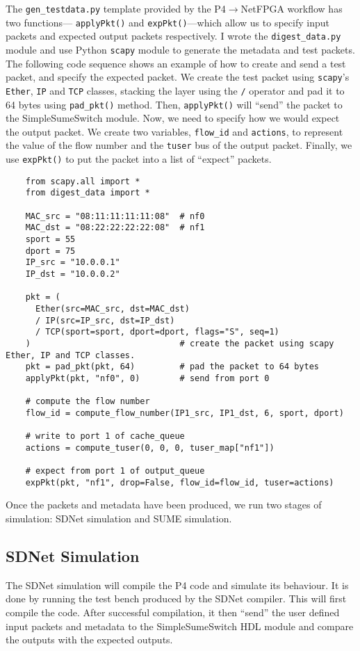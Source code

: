 The \texttt{gen\_testdata.py} template provided by the P4$\rightarrow$NetFPGA workflow has two functions--- \verb|applyPkt()| and \verb|expPkt()|---which allow us to specify input packets and expected output packets respectively. I wrote the \verb|digest_data.py| module and use Python \texttt{scapy} module to generate the metadata and test packets. The following code sequence shows an example of how to create and send a test packet, and specify the expected packet. We create the test packet using \texttt{scapy}'s \texttt{Ether}, \texttt{IP} and \texttt{TCP} classes, stacking the layer using the \texttt{/} operator and pad it to 64 bytes using \texttt{pad\_pkt()} method. Then, \verb|applyPkt()| will ``send'' the packet to the SimpleSumeSwitch module. Now, we need to specify how we would expect the output packet. We create two variables, \verb|flow_id| and \verb|actions|, to represent the value of the flow number and the \texttt{tuser} bus of the output packet. Finally, we use \verb|expPkt()| to put the packet into a list of ``expect'' packets.

{\renewcommand{\baselinestretch}{0.8}\small
	\begin{verbatim}
    from scapy.all import *
    from digest_data import *
	
    MAC_src = "08:11:11:11:11:08"  # nf0
    MAC_dst = "08:22:22:22:22:08"  # nf1
    sport = 55
    dport = 75
    IP_src = "10.0.0.1"
    IP_dst = "10.0.0.2"
	
    pkt = (
      Ether(src=MAC_src, dst=MAC_dst)
      / IP(src=IP_src, dst=IP_dst)
      / TCP(sport=sport, dport=dport, flags="S", seq=1)
    )                              # create the packet using scapy Ether, IP and TCP classes.
    pkt = pad_pkt(pkt, 64)         # pad the packet to 64 bytes
    applyPkt(pkt, "nf0", 0)        # send from port 0

    # compute the flow number
    flow_id = compute_flow_number(IP1_src, IP1_dst, 6, sport, dport)
    
    # write to port 1 of cache_queue
    actions = compute_tuser(0, 0, 0, tuser_map["nf1"])             
    
    # expect from port 1 of output_queue
    expPkt(pkt, "nf1", drop=False, flow_id=flow_id, tuser=actions)
	\end{verbatim}
}

Once the packets and metadata have been produced, we run two stages of simulation: SDNet simulation and SUME simulation.

\subsection{SDNet Simulation}
The SDNet simulation will compile the P4 code and simulate its behaviour. It is done by running the test bench produced by the SDNet compiler. This will first compile the code. After successful compilation, it then ``send'' the user defined input packets and metadata to the SimpleSumeSwitch HDL module and compare the outputs with the expected outputs. 

